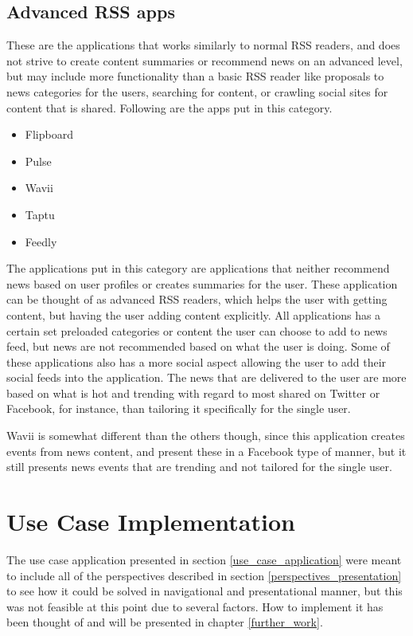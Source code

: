 \subsection{Advanced RSS apps}
These are the applications that works similarly to normal RSS readers, and does not strive to create content summaries or recommend news on an advanced level, but may include more functionality than a basic RSS reader like proposals to news categories for the users, searching for content, or crawling social sites for content that is shared. Following are the apps put in this category.

\begin{itemize}
	\item Flipboard
	\item Pulse
	\item Wavii
	\item Taptu
	\item Feedly
\end{itemize}

The applications put in this category are applications that neither recommend news based on user profiles or creates summaries for the user. These application can be thought of as advanced RSS readers, which helps the user with getting content, but having the user adding content explicitly. All applications has a certain set preloaded categories or content the user can choose to add to news feed, but news are not recommended based on what the user is doing. Some of these applications also has a more social aspect allowing the user to add their social feeds into the application. The news that are delivered to the user are more based on what is hot and trending with regard to most shared on Twitter or Facebook, for instance, than tailoring it specifically for the single user. 

Wavii is somewhat different than the others though, since this application creates events from news content, and present these in a Facebook type of manner, but it still presents news events that are trending and not tailored for the single user.

\section{Use Case Implementation}
The use case application presented in section \ref{use_case_application} were meant to include all of the perspectives described in section \ref{perspectives_presentation} to see how it could be solved in navigational and presentational manner, but this was not feasible at this point due to several factors. How to implement it has been thought of and will be presented in chapter \ref{further_work}.

